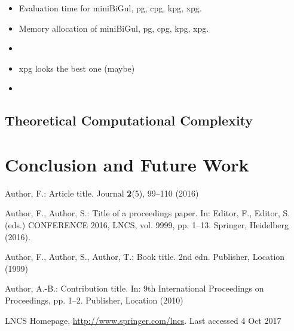 \documentclass[runningheads]{llncs}
\begin{document}
\begin{itemize}
\item Evaluation time for miniBiGul, pg, cpg, kpg, xpg.
\item Memory allocation of miniBiGul, pg, cpg, kpg, xpg.
\item []
\item xpg looks the best one (maybe)
\item 
\end{itemize}

\subsection{Theoretical Computational Complexity}

\section{Conclusion and Future Work}


% 
%
%
% 
% 
%
\begin{thebibliography}{8}
Author, F.: Article title. Journal \textbf{2}(5), 99--110 (2016)

Author, F., Author, S.: Title of a proceedings paper. In: Editor,
F., Editor, S. (eds.) CONFERENCE 2016, LNCS, vol. 9999, pp. 1--13.
Springer, Heidelberg (2016). 

Author, F., Author, S., Author, T.: Book title. 2nd edn. Publisher,
Location (1999)

Author, A.-B.: Contribution title. In: 9th International Proceedings
on Proceedings, pp. 1--2. Publisher, Location (2010)

LNCS Homepage, \url{http://www.springer.com/lncs}. Last accessed 4
Oct 2017
\end{thebibliography}
\end{document}
